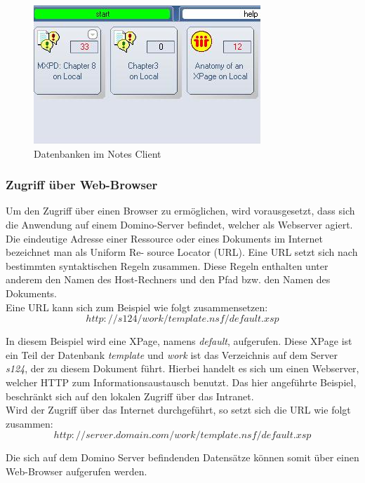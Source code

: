 \begin{figure}[H]
    \centerline{\includegraphics[scale=0.5]{pics/Client_kacheln}}
    \caption[Darstellung einer Datenbank im Notes Client]{\label{FiG:Darstellung einer Datenbank im Notes Client}
	Datenbanken im Notes Client}
\end{figure}


\subsubsection{Zugriff über Web-Browser}
\label{sec:5webzugriff}

Um den Zugriff über einen Browser zu ermöglichen, wird vorausgesetzt, dass sich die \linebreak
Anwendung auf einem Domino-Server befindet, welcher als Webserver
agiert\cite{ebel}.
Die eindeutige Adresse einer Ressource oder eines Dokuments im Internet bezeichnet man als Uniform Re-\linebreak
source Locator (URL). Eine URL setzt sich nach 
bestimmten syntaktischen Regeln zusammen. Diese Regeln enthalten unter anderem den Namen des Host-Rechners und den Pfad bzw.
den Namen des Dokuments\cite{knaepper}.\\
\newline
Eine URL kann sich zum Beispiel wie folgt zusammensetzen:
\begin{equation}
http://s124/work/template.nsf/default.xsp
\end{equation} 

In diesem Beispiel wird eine XPage, namens \textit{default}, aufgerufen. Diese XPage ist ein Teil der Datenbank \textit{template} und \textit{work} ist das
Verzeichnis auf dem Server \textit{s124}, der zu diesem Dokument führt. Hierbei handelt es sich um einen Webserver, welcher HTTP 
zum Informationsaustausch benutzt. Das hier angeführte Beispiel, beschränkt sich auf den lokalen Zugriff über das Intranet.\\
\newline
 Wird der Zugriff über das Internet durchgeführt, so setzt sich die URL wie folgt zusammen:
\begin{equation}
http://server.domain.com/work/template.nsf/default.xsp
\end{equation} 


Die sich auf dem Domino Server befindenden Datensätze können somit über einen Web-Browser aufgerufen werden. 
 




